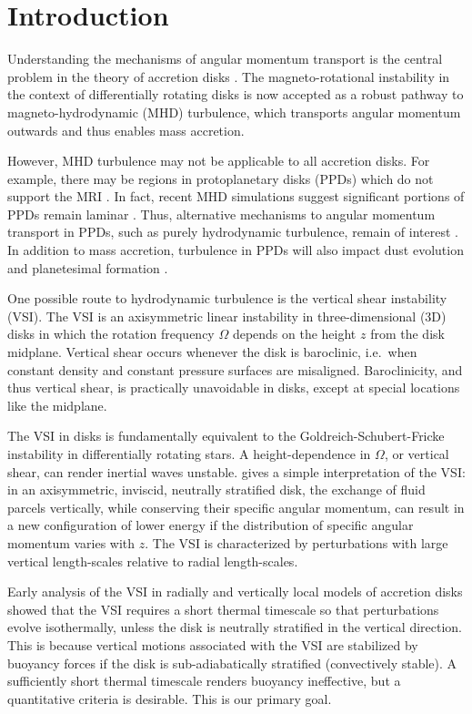 \documentclass[iop]{emulateapj}
\begin{document}
\section{Introduction}\label{intro}
Understanding the mechanisms of angular momentum transport is the
central problem in the theory of accretion disks 
\citep{lyndenbell74}. The   
magneto-rotational instability in the context of differentially
rotating disks \citep[MRI,][]{balbus91} is now accepted as a robust
pathway to magneto-hydrodynamic (MHD) turbulence, which transports
angular momentum outwards and thus enables mass accretion. 

However, MHD turbulence may not be applicable to all  
accretion disks. For example, there may be regions in protoplanetary  
disks (PPDs) which do not support the MRI 
\citep{gammie96,landry13}. In fact, recent MHD simulations
suggest significant portions of PPDs remain laminar \citep[e.g.][and references
therein]{lesur14,bai15,gressel15}. Thus, alternative mechanisms 
to angular momentum transport in PPDs, such as purely hydrodynamic
turbulence,  remain of interest \citep{armitage10}. In addition to
mass accretion, turbulence in PPDs will also
impact dust evolution and planetesimal formation \citep{chiang10}. 

One possible route to hydrodynamic turbulence is the vertical shear
instability (VSI). The VSI is an 
axisymmetric linear instability 
in three-dimensional (3D) disks in which the rotation frequency
$\Omega$ depends on the height $z$ from the disk midplane. 
Vertical shear occurs whenever the disk is baroclinic, i.e.\ when constant 
density and constant pressure surfaces are misaligned.  Baroclinicity, and thus vertical shear, is 
practically unavoidable in disks, except at special locations like the midplane.

The VSI  in disks is fundamentally equivalent to the
Goldreich-Schubert-Fricke instability 
\citep[GSFI,][]{goldreich67,fricke68} in differentially rotating stars.   
A height-dependence in $\Omega$, or vertical shear, can render
inertial waves unstable. \cite{barker15} gives a simple 
interpretation of the VSI: in an axisymmetric, inviscid, neutrally
stratified disk, the exchange of fluid parcels vertically, while
conserving their specific angular momentum, can result in a new
configuration of lower energy if the distribution of specific angular
momentum varies with $z$. The VSI is characterized by perturbations
with large vertical length-scales  relative to radial length-scales.   

Early analysis of the VSI in radially and vertically local 
models of accretion disks \citep{urpin98,urpin03} showed that the VSI
requires a short thermal timescale so that perturbations evolve 
isothermally, unless the disk is neutrally stratified in the vertical
direction. This is because
vertical motions associated with the VSI 
are stabilized by buoyancy forces if the disk is sub-adiabatically
stratified (convectively stable). A sufficiently short thermal
timescale renders buoyancy ineffective, but a quantitative criteria is
desirable. This is our primary goal.  
\end{document}
